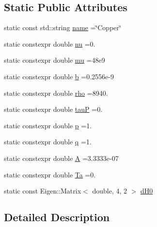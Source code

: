 \subsection*{Static Public Attributes}
\begin{DoxyCompactItemize}
\item 
static const std\+::string \hyperlink{structmodel_1_1_periodic_element_3_0129_00_01_isotropic_01_4_aa44d613baee4052fbb765b9c9dbdf01b}{name} =\char`\"{}Copper\char`\"{}
\item 
static constexpr double \hyperlink{structmodel_1_1_periodic_element_3_0129_00_01_isotropic_01_4_a91901c3133017d353fb32a5c021ae12a}{nu} =0.
\item 
static constexpr double \hyperlink{structmodel_1_1_periodic_element_3_0129_00_01_isotropic_01_4_a742a2212eb30c87dba2656e8e1652a31}{mu} =48e9
\item 
static constexpr double \hyperlink{structmodel_1_1_periodic_element_3_0129_00_01_isotropic_01_4_af2627e955d53c1a539b818806c7926ca}{b} =0.\+2556e-\/9
\item 
static constexpr double \hyperlink{structmodel_1_1_periodic_element_3_0129_00_01_isotropic_01_4_a609e7ff6cc0c9f0669856defdfe05aa2}{rho} =8940.
\item 
static constexpr double \hyperlink{structmodel_1_1_periodic_element_3_0129_00_01_isotropic_01_4_a61ad64a1596b7b810e2fdd03e2d2417d}{tau\+P} =0.
\item 
static constexpr double \hyperlink{structmodel_1_1_periodic_element_3_0129_00_01_isotropic_01_4_af4905a41079b441ef872b683cceeae70}{p} =1.
\item 
static constexpr double \hyperlink{structmodel_1_1_periodic_element_3_0129_00_01_isotropic_01_4_a53af0529596269a6642b37cd29afe12b}{q} =1.
\item 
static constexpr double \hyperlink{structmodel_1_1_periodic_element_3_0129_00_01_isotropic_01_4_a8e5ba5bff431a3e327d7c93800354101}{A} =3.\+3333e-\/07
\item 
static constexpr double \hyperlink{structmodel_1_1_periodic_element_3_0129_00_01_isotropic_01_4_a33509e726cdb121a126343761e1cacbb}{Ta} =0.
\item 
static const Eigen\+::\+Matrix$<$ double, 4, 2 $>$ \hyperlink{structmodel_1_1_periodic_element_3_0129_00_01_isotropic_01_4_ada99a134c11f80b15b76d975405d6b02}{d\+H0}
\end{DoxyCompactItemize}


\subsection{Detailed Description}
